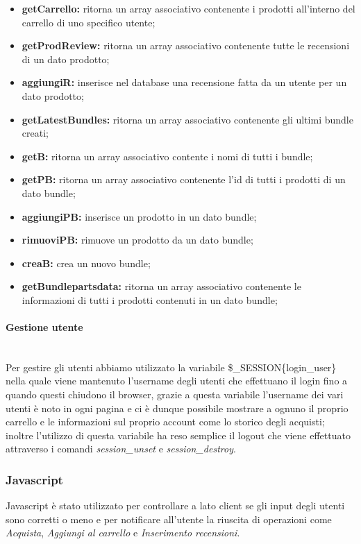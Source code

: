\begin{itemize}
    \item \textbf{getCarrello:} ritorna un array associativo contenente i prodotti all'interno del carrello di uno specifico utente;
	\item \textbf{getProdReview:} ritorna un array associativo contenente tutte le recensioni di un dato prodotto;
	\item \textbf{aggiungiR:} inserisce nel database una recensione fatta da un utente per un dato prodotto;
	\item \textbf{getLatestBundles:} ritorna un array associativo contenente gli ultimi bundle creati; 
	\item \textbf{getB:} ritorna un array associativo contente i nomi di tutti i bundle;
	\item \textbf{getPB:} ritorna un array associativo contenente l'id di tutti i prodotti di un dato bundle;
	\item \textbf{aggiungiPB:} inserisce un prodotto in un dato bundle;
	\item \textbf{rimuoviPB:} rimuove un prodotto da un dato bundle;
	\item \textbf{creaB:} crea un nuovo bundle;
	\item \textbf{getBundlepartsdata:} ritorna un array associativo contenente le informazioni di tutti i prodotti contenuti in un dato bundle;
\end{itemize}

\paragraph{Gestione utente} \mbox{} \\
Per gestire gli utenti abbiamo utilizzato la variabile \$\_SESSION\{login\_user\} nella quale viene mantenuto l'username degli utenti che effettuano il login fino a quando questi chiudono il browser, grazie a questa variabile l'username dei vari utenti è noto in ogni pagina e ci è dunque possibile mostrare a ognuno il proprio carrello e le informazioni sul proprio account come lo storico degli acquisti;
inoltre l'utilizzo di questa variabile ha reso semplice il logout che viene effettuato attraverso i comandi \emph{session\_unset} e \emph{session\_destroy}.

\subsubsection{Javascript}
Javascript è stato utilizzato per controllare a lato client se gli input degli utenti sono corretti o meno e per notificare all'utente la riuscita di operazioni come 
\emph{Acquista}, \emph{Aggiungi al carrello} e \emph{Inserimento recensioni}.


